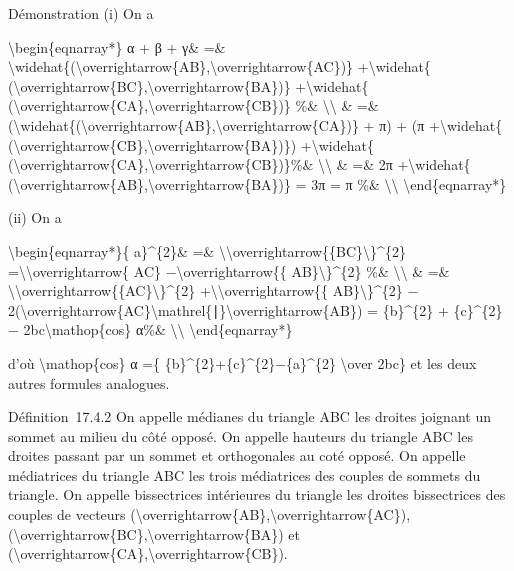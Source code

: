 \documentclass[]{article}
\begin{document}
Démonstration (i) On a

\textbackslash{}begin\{eqnarray*\} α + β + γ\& =\&
\textbackslash{}widehat\{(\textbackslash{}overrightarrow\{AB\},\textbackslash{}overrightarrow\{AC\})\}
+\textbackslash{}widehat\{
(\textbackslash{}overrightarrow\{BC\},\textbackslash{}overrightarrow\{BA\})\}
+\textbackslash{}widehat\{
(\textbackslash{}overrightarrow\{CA\},\textbackslash{}overrightarrow\{CB\})\}
\%\& \textbackslash{}\textbackslash{} \& =\&
(\textbackslash{}widehat\{(\textbackslash{}overrightarrow\{AB\},\textbackslash{}overrightarrow\{CA\})\}
+ π) + (π +\textbackslash{}widehat\{
(\textbackslash{}overrightarrow\{CB\},\textbackslash{}overrightarrow\{BA\})\})
+\textbackslash{}widehat\{
(\textbackslash{}overrightarrow\{CA\},\textbackslash{}overrightarrow\{CB\})\}\%\&
\textbackslash{}\textbackslash{} \& =\& 2π +\textbackslash{}widehat\{
(\textbackslash{}overrightarrow\{AB\},\textbackslash{}overrightarrow\{BA\})\}
= 3π = π \%\& \textbackslash{}\textbackslash{}
\textbackslash{}end\{eqnarray*\}

(ii) On a

\textbackslash{}begin\{eqnarray*\}\{ a\}\^{}\{2\}\& =\&
\textbackslash{}\textbar{}\textbackslash{}overrightarrow\{\{BC\}\textbackslash{}\textbar{}\}\^{}\{2\}
=\textbackslash{}\textbar{}\textbackslash{}overrightarrow\{ AC\}
−\textbackslash{}overrightarrow\{\{
AB\}\textbackslash{}\textbar{}\}\^{}\{2\} \%\&
\textbackslash{}\textbackslash{} \& =\&
\textbackslash{}\textbar{}\textbackslash{}overrightarrow\{\{AC\}\textbackslash{}\textbar{}\}\^{}\{2\}
+\textbackslash{}\textbar{}\textbackslash{}overrightarrow\{\{
AB\}\textbackslash{}\textbar{}\}\^{}\{2\} −
2(\textbackslash{}overrightarrow\{AC\}\textbackslash{}mathrel\{∣\}\textbackslash{}overrightarrow\{AB\})
= \{b\}\^{}\{2\} + \{c\}\^{}\{2\} − 2bc\textbackslash{}mathop\{cos\}
α\%\& \textbackslash{}\textbackslash{} \textbackslash{}end\{eqnarray*\}

d'où \textbackslash{}mathop\{cos\} α =\{
\{b\}\^{}\{2\}+\{c\}\^{}\{2\}−\{a\}\^{}\{2\} \textbackslash{}over 2bc\}
et les deux autres formules analogues.

Définition~17.4.2 On appelle médianes du triangle ABC les droites
joignant un sommet au milieu du côté opposé. On appelle hauteurs du
triangle ABC les droites passant par un sommet et orthogonales au coté
opposé. On appelle médiatrices du triangle ABC les trois médiatrices des
couples de sommets du triangle. On appelle bissectrices intérieures du
triangle les droites bissectrices des couples de vecteurs
(\textbackslash{}overrightarrow\{AB\},\textbackslash{}overrightarrow\{AC\}),
(\textbackslash{}overrightarrow\{BC\},\textbackslash{}overrightarrow\{BA\})
et
(\textbackslash{}overrightarrow\{CA\},\textbackslash{}overrightarrow\{CB\}).
\end{document}

